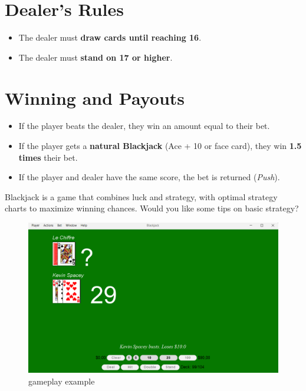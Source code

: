 \section{Dealer's Rules}

\begin{itemize}
    \item The dealer must \textbf{draw cards until reaching 16}.
    \item The dealer must \textbf{stand on 17 or higher}.
\end{itemize}

\section{Winning and Payouts}

\begin{itemize}
    \item If the player beats the dealer, they win an amount equal to their bet.
    \item If the player gets a \textbf{natural Blackjack} (Ace + 10 or face card), they win \textbf{1.5 times} their bet.
    \item If the player and dealer have the same score, the bet is returned (\textit{Push}).
\end{itemize}

Blackjack is a game that combines luck and strategy, with optimal strategy charts to maximize winning chances. Would you like some tips on basic strategy?


\begin{figure}[!htb]
    \centering
    \includegraphics[scale=0.55]{report/img/screeen.png}
    \caption{gameplay example}
    \label{fig:scren1}
\end{figure}


